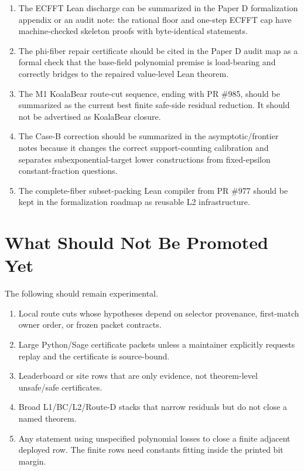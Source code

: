 \documentclass[a4paper,11pt]{amsart}
\begin{document}
\begin{enumerate}
\item The ECFFT Lean discharge can be summarized in the Paper D formalization
appendix or an audit note: the rational floor and one-step ECFFT cap have
machine-checked skeleton proofs with byte-identical statements.
\item The phi-fiber repair certificate should be cited in the Paper D audit
map as a formal check that the base-field polynomial premise is load-bearing
and correctly bridges to the repaired value-level Lean theorem.
\item The M1 KoalaBear route-cut sequence, ending with PR \#985, should be
summarized as the current best finite safe-side residual reduction.  It should
not be advertised as KoalaBear closure.
\item The Case-B correction should be summarized in the asymptotic/frontier
notes because it changes the correct support-counting calibration and
separates subexponential-target lower constructions from fixed-epsilon
constant-fraction questions.
\item The complete-fiber subset-packing Lean compiler from PR \#977 should be
kept in the formalization roadmap as reusable L2 infrastructure.
\end{enumerate}

\section{What Should Not Be Promoted Yet}

The following should remain experimental.

\begin{enumerate}
\item Local route cuts whose hypotheses depend on selector provenance,
first-match owner order, or frozen packet contracts.
\item Large Python/Sage certificate packets unless a maintainer explicitly
requests replay and the certificate is source-bound.
\item Leaderboard or site rows that are only evidence, not theorem-level
unsafe/safe certificates.
\item Broad L1/BC/L2/Route-D stacks that narrow residuals but do not close a
named theorem.
\item Any statement using unspecified polynomial losses to close a finite
adjacent deployed row.  The finite rows need constants fitting inside the
printed bit margin.
\end{enumerate}
\end{document}
